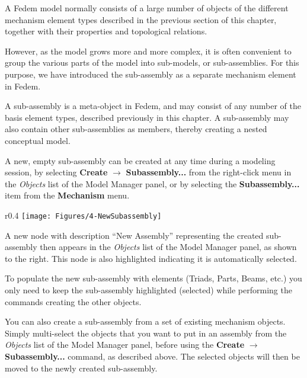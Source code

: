 A Fedem model normally consists of a large number of objects of the
different mechanism element types described in the previous section of
this chapter, together with their properties and topological relations.

However, as the model grows more and more complex, it is often
convenient to group the various parts of the model into sub-models, or
sub-assemblies. For this purpose, we have introduced the sub-assembly as
a separate mechanism element in Fedem.

A sub-assembly is a meta-object in Fedem, and may consist of any number
of the basis element types, described previously in this chapter.
A sub-assembly may also contain other sub-assemblies as members,
thereby creating a nested conceptual model.



A new, empty sub-assembly can be created at any time during a modeling session,
by selecting \textbf{Create} $\rightarrow$ \textbf{Subassembly...} from the
right-click menu in the {\sl Objects} list of the Model Manager panel, or by
selecting the \textbf{Subassembly...} item from the \textbf{Mechanism} menu.

\begin{wrapfigure}[6]{r}{0.4\textwidth}
  \vspace{-4mm}
  \texttt{[image: Figures/4-NewSubassembly]}
\end{wrapfigure}

A new node with description ``New Assembly'' representing the created
sub-assembly then appears in the {\sl Objects} list of the Model Manager panel,
as shown to the right. This node is also highlighted indicating it is
automatically selected.

To populate the new sub-assembly with elements (Triads, Parts, Beams, etc.)
you only need to keep the sub-assembly highlighted (selected)
while performing the commands creating the other objects.

You can also create a sub-assembly from a set of existing mechanism objects.
Simply multi-select the objects that you want to put in an assembly from the
{\sl Objects} list of the Model Manager panel, before using the \textbf{Create}
$\rightarrow$ \textbf{Subassembly...} command, as described above.
The selected objects will then be moved to the newly created sub-assembly.



